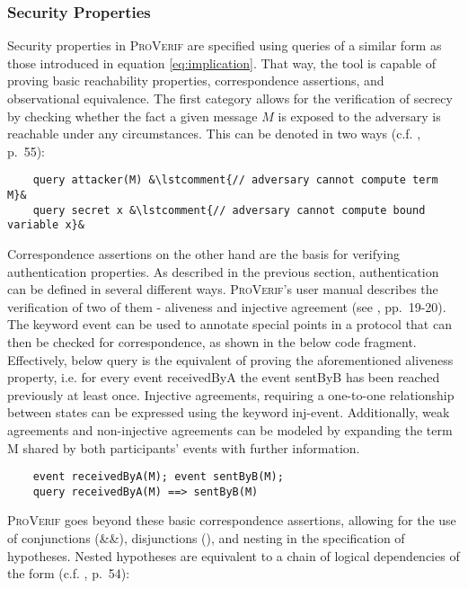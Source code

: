 \subsubsection{Security Properties}

Security properties in \textsc{ProVerif} are specified using queries of a similar form as those introduced in equation \ref{eq:implication}.
That way, the tool is capable of proving basic reachability properties, correspondence assertions, and observational equivalence.
The first category allows for the verification of secrecy by checking whether the fact a given message $M$ is exposed to the adversary is reachable under any circumstances.
This can be denoted in two ways (c.f. \cite{blanchet2020proverif}, p.~55):

\begin{lstlisting}
    query attacker(M) &\lstcomment{// adversary cannot compute term M}&
    query secret x &\lstcomment{// adversary cannot compute bound variable x}&
\end{lstlisting}

Correspondence assertions on the other hand are the basis for verifying authentication properties.
As described in the previous section, authentication can be defined in several different ways.
\textsc{ProVerif}'s user manual describes the verification of two of them - aliveness and injective agreement (see \cite{blanchet2020proverif}, pp.~19-20).
The keyword \textsf{event} can be used to annotate special points in a protocol that can then be checked for correspondence, as shown in the below code fragment.
Effectively, below query is the equivalent of proving the aforementioned aliveness property, i.e. for every event \textsf{receivedByA} the event \textsf{sentByB} has been reached previously at least once.
Injective agreements, requiring a one-to-one relationship between states can be expressed using the keyword \textsf{inj-event}.
Additionally, weak agreements and non-injective agreements can be modeled by expanding the term \textsf{M} shared by both participants' events with further information.

\begin{lstlisting}
    event receivedByA(M); event sentByB(M);
    query receivedByA(M) ==> sentByB(M)
\end{lstlisting}

\noindent
\textsc{ProVerif} goes beyond these basic correspondence assertions, allowing for the use of conjunctions (\textsf{\&\&}), disjunctions (\textsf{\textbar\textbar}), and nesting in the specification of hypotheses.
Nested hypotheses are equivalent to a chain of logical dependencies of the form (c.f. \cite{blanchet2020proverif}, p.~54):


